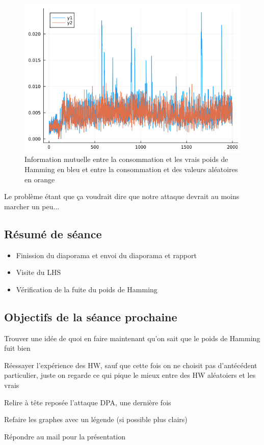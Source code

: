 \documentclass[12pt]{article}
\newcommand{\cmark}{\ding{51}}%
\newcommand{\done}{\rlap{$\square$}{\raisebox{2pt}{\large\hspace{1pt}\cmark}}%
	\hspace{-2.5pt}}
\begin{document}
	\begin{figure}[H]
		\centering
		\includegraphics[scale=0.8]{img_files/HWvrai_vs_HWalea}
		\caption{Information mutuelle entre la consommation et les vrais poids de Hamming en bleu et entre la consommation et des valeurs aléatoires en orange}
	\end{figure}
	
	Le problème étant que ça voudrait dire que notre attaque devrait au moins marcher un peu...
	
	\subsection{Résumé de séance}
	\begin{itemize}
		\item Finission du diaporama et envoi du diaporama et rapport
		\item Visite du LHS
		\item Vérification de la fuite du poids de Hamming
	\end{itemize}
	
	\subsection{Objectifs de la séance prochaine}
	\begin{todolist}
		\item[\done] Trouver une idée de quoi en faire maintenant qu'on sait que le poids de Hamming fuit bien
		\item[\done] Réessayer l'expérience des HW, sauf que cette fois on ne choisit pas d'antécédent particulier, juste on regarde ce qui pique le mieux entre des HW aléatoiers et les vrais
		\item[\done] Relire à tête reposée l'attaque DPA, une dernière fois
		\item[\done] Refaire les graphes avec un légende (si possible plus clairs)
		\item[\done] Répondre au mail pour la présentation
	\end{todolist}
	
\end{document}
